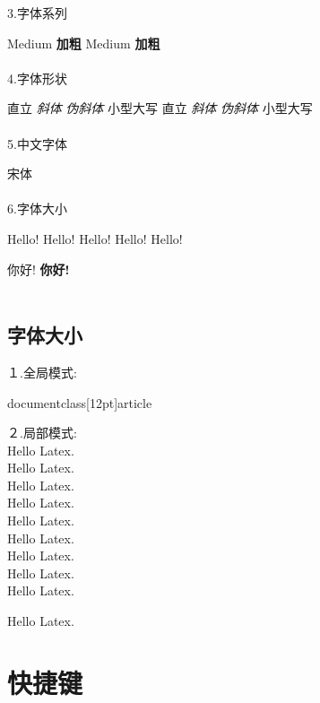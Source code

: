 \documentclass[12pt]{ctexart}
\begin{document}
3.字体系列
\par \textmd{Medium} \textbf{加粗}
{\mdseries Medium} {\bfseries 加粗} \\\\

4.字体形状
\par \textup{直立} \textit{斜体} \textsl{伪斜体} \textsc{小型大写}
{\upshape 直立} {\itshape 斜体}
{\slshape 伪斜体} {\scshape 小型大写} \\\\

5.中文字体
\par {\songti 宋体}  
\\\\

6.字体大小
\par {\tiny Hello!} {\small Hello!} {\normalsize Hello!} 
{\large Hello!} {\huge Hello!} 

 你好!
\newcommand\myfont{\textbf{\textsf 你好!}}\myfont \\\\

\subsection{字体大小}
１.全局模式: 

documentclass[12pt]{article}

２.局部模式:　\\
Hello Latex.\\
\tiny Hello Latex.\\
\scriptsize Hello Latex.\\
\footnotesize Hello Latex.\\
\small Hello Latex.\\
\normalsize Hello Latex.\\
\large Hello Latex.\\
\Large Hello Latex.\\
{\LARGE Hello Latex.}\\
\begin{huge} 
	Hello Latex. 
\end{huge}
\normalsize		%


\section{快捷键}
\end{document}
